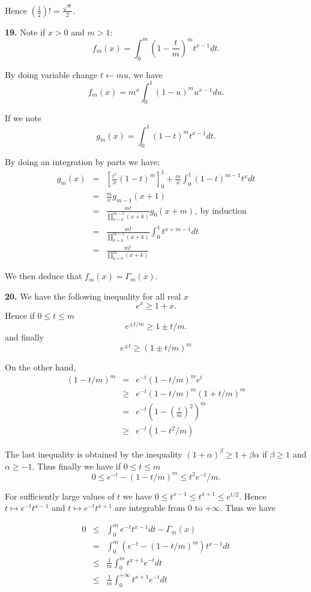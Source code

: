 \documentclass[a4paper,12pt]{article}
\newcommand{\newpar}[1]{\bigskip \noindent \textbf{#1.}}
\newcommand{\la}{\leftarrow}
\begin{document}
Hence $\left(\frac{1}{2}\right)! = \frac{\sqrt{\pi}}{2}$.

\newpar{19} Note if $x>0$ and $m>1$:
\[ f_m(x) = \int_0^m \left( 1 - \frac{t}{m} \right)^m t^{x-1} dt.\]

By doing variable change $t \la mu$, we have
\[ f_m(x) = m^x\int_0^1 (1 - u)^m  u^{x-1} du.\]

If we note
\[g_m(x) = \int_0^1 (1 - t)^m  t^{x-1} dt.\]

By doing an integration by parts we have:
\begin{eqnarray*}
  g_m(x) &=& \left[ \frac{t^x}{x} (1-t)^m
    \right]_0^1 + \frac{m}{x} \int_0^1 (1-t)^{m-1} t^x dt \\
  &=& \frac{m}{x} g_{m-1}(x+1) \\
  &=& \frac{m!}{\prod_{k=0}^{m-1} (x+k)}g_0(x+m),\ \mbox{by
    induction}\\
  &=& \frac{m!}{\prod_{k=0}^{m-1}(x+k)} \int_0^1 t^{x+m-1}dt\\
  &=& \frac{m!}{\prod_{k=0}^m(x+k)}
\end{eqnarray*}

We then deduce that $f_m(x) = \Gamma_m(x).$

\newpar{20} We have the following inequality for all real $x$
\[ e^x \ge 1+x.\]
Hence if $0\le t \le m$ \[ e^{\pm t/m} \ge 1 \pm t/m.\]
and finally \[ e^{\pm t} \ge (1 \pm t/m)^m\]

On the other hand,
\begin{eqnarray*}
  (1 - t/m)^m &=& e^{-t} (1-t/m)^m e^t \\
  &\ge& e^{-t} (1-t/m)^m (1+t/m)^m \\
  &=& e^{-t} \left(1-\left(\frac{t}{m}\right)^2\right)^m \\
  &\ge& e^{-t} (1 - t^2/m)
\end{eqnarray*}

The last inequality is obtained by the inequality $(1+\alpha)^\beta
\ge 1 + \beta\alpha$ if $\beta \ge 1$ and $\alpha \ge -1$.  Thus
finally we have if $0\le t\le m$
\[ 0 \le e^{-t} - (1-t/m)^m \le t^2e^{-t}/m.\]

For sufficiently large values of $t$ we have $0 \le t^{x-1} \le
t^{x+1} \le e^{t/2}$.  Hence $t \mapsto e^{-t}t^{x-1}$ and $t\mapsto
e^{-t}t^{x+1}$ are integrable from $0$ to $+\infty$. Thus we have

\begin{eqnarray*}
  0 &\le& \int_0^m e^{-t} t^{x-1} dt - \Gamma_m(x) \\
  &=& \int_0^m (e^{-t} - (1-t/m)^m) t^{x-1} dt \\
  &\le& \frac{1}{m} \int_0^m t^{x+1} e^{-t} dt \\
  &\le& \frac{1}{m} \int_0^{+\infty} t^{x+1}e^{-t} dt
\end{eqnarray*}
\end{document}
